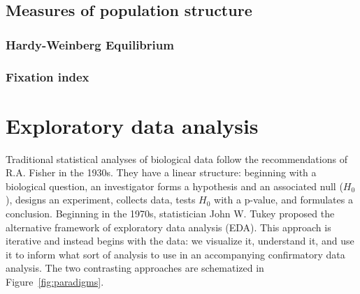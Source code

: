 \subsection{Measures of population structure}

\subsubsection{Hardy-Weinberg Equilibrium}

\subsubsection{Fixation index}

\section{Exploratory data analysis}

Traditional statistical analyses of biological data follow the recommendations of R.A. Fisher in the 1930s\citep{holmes_modern_2019}. They have a linear structure: beginning with a biological question, an investigator forms a hypothesis and an associated null ($H_0$), designs an experiment, collects data, tests $H_0$ with a p-value, and formulates a conclusion. Beginning in the 1970s, statistician John W. Tukey proposed the alternative framework of exploratory data analysis (EDA)\citep{tukey_1977,hoaglin_john_2003}. This approach is iterative and instead begins with the data: we visualize it, understand it, and use it to inform what sort of analysis to use in an accompanying confirmatory data analysis. The two contrasting approaches are schematized in Figure~\ref{fig:paradigms}.

